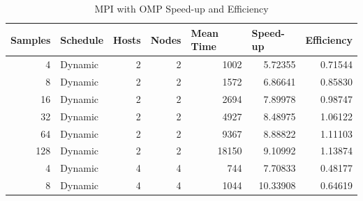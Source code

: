 \documentclass[journal,transmag]{IEEEtran}
\begin{document}
\section{}
	\begin{table}[h]
	\centering
	\caption{MPI with OMP Speed-up and Efficiency}
	\label{table_ompi_data}
	\begin{tabular}{|r|l|r|r|r|r|r|}
		\hline
		\multicolumn{1}{|l|}{Samples} & Schedule & \multicolumn{1}{l|}{Hosts} & \multicolumn{1}{l|}{Nodes} & \multicolumn{1}{l|}{Mean Time} & \multicolumn{1}{l|}{Speed-up} & \multicolumn{1}{l|}{Efficiency} \\ \hline
		4                             & Dynamic  & 2                          & 2                          & 1002                           & 5.72355                       & 0.71544                         \\ \hline
		8                             & Dynamic  & 2                          & 2                          & 1572                           & 6.86641                       & 0.85830                         \\ \hline
		16                            & Dynamic  & 2                          & 2                          & 2694                           & 7.89978                       & 0.98747                         \\ \hline
		32                            & Dynamic  & 2                          & 2                          & 4927                           & 8.48975                       & 1.06122                         \\ \hline
		64                            & Dynamic  & 2                          & 2                          & 9367                           & 8.88822                       & 1.11103                         \\ \hline
		128                           & Dynamic  & 2                          & 2                          & 18150                          & 9.10992                       & 1.13874                         \\ \hline
		4                             & Dynamic  & 4                          & 4                          & 744                            & 7.70833                       & 0.48177                         \\ \hline
		8                             & Dynamic  & 4                          & 4                          & 1044                           & 10.33908                      & 0.64619                         \\ \hline

\end{tabular}
\end{table}
\end{document}
